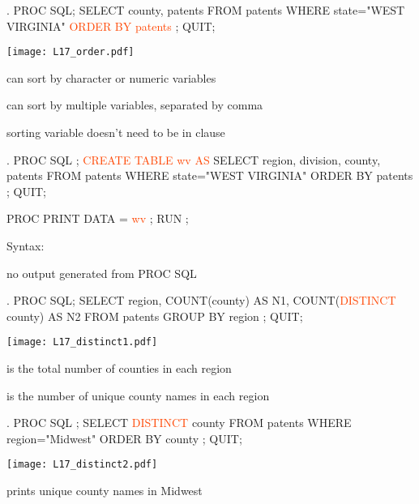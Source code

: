 \begin{frame}[fragile]
\begin{code}{.}
PROC SQL;
   SELECT county, patents
   FROM patents
   WHERE state="WEST VIRGINIA"
   \textcolor{OrangeRed}{ORDER BY patents}
   ;
QUIT;
\end{code}
\emp
\blankcolumn
{}
\texttt{[image: L17\_order.pdf]}
\emp
\bi
\item[]
\item can sort by character or numeric variables
\item can sort by multiple variables, separated by comma
\item sorting variable doesn't need to be in  clause
\ei
\end{frame}

\begin{frame}[fragile]
\begin{code}{.}
PROC SQL ;
   \textcolor{OrangeRed}{CREATE TABLE wv AS}
   SELECT region, division, county, patents
   FROM patents
   WHERE state="WEST VIRGINIA"
   ORDER BY patents
   ;
QUIT;

PROC PRINT DATA = \textcolor{OrangeRed}{wv} ;
RUN ;
\end{code}
\emp
\bi
\item[]
\item Syntax: 
\item no output generated from PROC SQL
\ei
\end{frame}

\begin{frame}[fragile]
\begin{code}{.}
PROC SQL;
  SELECT region,
    COUNT(county) AS N1,
    COUNT(\textcolor{OrangeRed}{DISTINCT} county) AS N2
  FROM patents
  GROUP BY region
  ;
QUIT;
\end{code}
\emp
\blankcolumn
{}
\texttt{[image: L17\_distinct1.pdf]}
\emp
\bi
\item[]
\item {} is the total number of counties in each region
\item {} is the number of unique county names in each region
\ei
\end{frame}

\begin{frame}[fragile]
\begin{code}{.}
PROC SQL ;
   SELECT \textcolor{OrangeRed}{DISTINCT} county
   FROM patents
   WHERE region="Midwest"
   ORDER BY county
   ;
QUIT;
\end{code}
\emp
\blankcolumn
{}
\texttt{[image: L17\_distinct2.pdf]}
\emp
\bi
\item[]
\item prints unique county names in Midwest
\ei
\end{frame}

